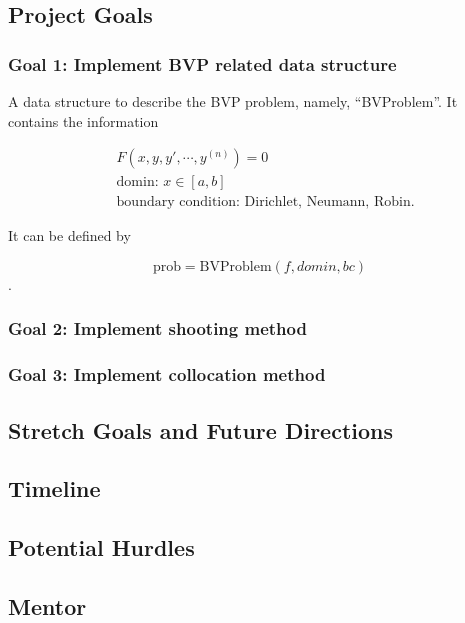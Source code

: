 \documentclass[a4paper,12pt,onecolumn]{article}
\begin{document}
\subsection{Project Goals}
\subsubsection{Goal 1: Implement BVP related data structure}
A data structure to describe the BVP problem, namely, ``BVProblem''. It contains the information

\begin{align*}
	&F(x, y, y', \cdots, y^{(n)}) = 0 \\
	&\text{domin: }x \in [a, b] \\
	&\text{boundary condition: Dirichlet, Neumann, Robin}.
\end{align*}

It can be defined by

\[\text{prob} = \text{BVProblem}(f,domin,bc)\].

\subsubsection{Goal 2: Implement shooting method}


\subsubsection{Goal 3: Implement collocation method}


\subsection{Stretch Goals and Future Directions}

\subsection{Timeline}

\subsection{Potential Hurdles} %
\label{sub:potential_hurdles}


\subsection{Mentor} %
\label{sub:mentor}
\end{document}
